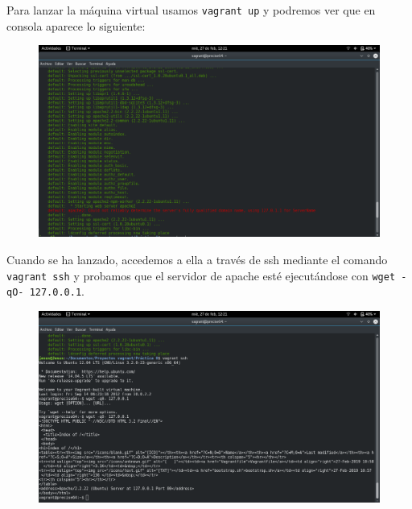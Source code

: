 \documentclass[12pt,letterpaper]{article}
\begin{document}
Para lanzar la máquina virtual usamos \texttt{vagrant up} y podremos ver que en consola aparece lo siguiente:
\begin{figure}[h]
	\centering
	\includegraphics[scale=0.3]{Instalacion.png}
\end{figure}
\newpage
Cuando se ha lanzado, accedemos a ella a través de ssh mediante el comando \texttt{vagrant ssh} y probamos que el servidor de apache esté ejecutándose con \texttt{wget -qO- 127.0.0.1}.
\begin{figure}[h]
	\centering
	\includegraphics[scale=0.3]{ssh.png}
\end{figure}
\end{document}
